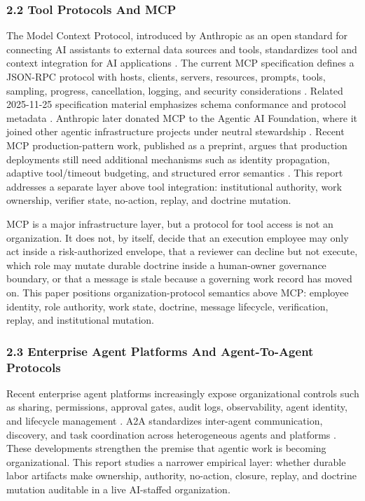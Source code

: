 \documentclass[
]{article}
\begin{document}
\subsubsection{2.2 Tool Protocols And MCP}\label{tool-protocols-and-mcp}

The Model Context Protocol, introduced by Anthropic as an open standard for connecting AI assistants to external data sources and tools, standardizes tool and context integration for AI applications \citep{anthropic2024modelContextProtocol}. The current MCP specification defines a JSON-RPC protocol with hosts, clients, servers, resources, prompts, tools, sampling, progress, cancellation, logging, and security considerations \citep{mcp2025specification}. Related 2025-11-25 specification material emphasizes schema conformance and protocol metadata \citep{mcp2025basicSpecification}. Anthropic later donated MCP to the Agentic AI Foundation, where it joined other agentic infrastructure projects under neutral stewardship \citep{anthropic2025mcpAaifDonation}. Recent MCP production-pattern work, published as a preprint, argues that production deployments still need additional mechanisms such as identity propagation, adaptive tool/timeout budgeting, and structured error semantics \citep{srinivasan2026bridgingProtocolProduction}. This report addresses a separate layer above tool integration: institutional authority, work ownership, verifier state, no-action, replay, and doctrine mutation.

MCP is a major infrastructure layer, but a protocol for tool access is not an organization. It does not, by itself, decide that an execution employee may only act inside a risk-authorized envelope, that a reviewer can decline but not execute, which role may mutate durable doctrine inside a human-owner governance boundary, or that a message is stale because a governing work record has moved on. This paper positions organization-protocol semantics above MCP: employee identity, role authority, work state, doctrine, message lifecycle, verification, replay, and institutional mutation.

\subsubsection{2.3 Enterprise Agent Platforms And Agent-To-Agent Protocols}\label{enterprise-agent-platforms-and-agent-to-agent-protocols}

Recent enterprise agent platforms increasingly expose organizational controls such as sharing, permissions, approval gates, audit logs, observability, agent identity, and lifecycle management \citep{openai2026workspaceAgents, googleCloud2026geminiEnterpriseAgents, googleCloud2026agentIdentity, microsoft2026copilotStudioAgentReadiness, salesforce2026agentforcePlatform}. A2A standardizes inter-agent communication, discovery, and task coordination across heterogeneous agents and platforms \citep{google2025agent2agent, linuxFoundation2025agent2agentProject}. These developments strengthen the premise that agentic work is becoming organizational. This report studies a narrower empirical layer: whether durable labor artifacts make ownership, authority, no-action, closure, replay, and doctrine mutation auditable in a live AI-staffed organization.
\end{document}
